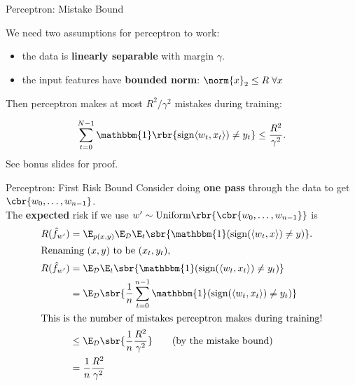 \documentclass[notheorems]{beamer}
\begin{document}
    \begin{frame}{Perceptron: Mistake Bound}
        \begin{theorem}
            We need two assumptions for perceptron to work:
            \begin{itemize}
                \item the data is \textbf{linearly separable} with margin $\gamma$.
                \item the input features have \textbf{bounded norm}: $\norm{x}_2 \leq R \; \forall x$
            \end{itemize}
            Then perceptron makes at most $R^2 / \gamma^2$ mistakes during training:
            \begin{minipage}[t]{0.6\textwidth}
                \[ \sum_{t=0}^{N-1} \mathbbm{1}\rbr{\text{sign}\langle w_t, x_t \rangle) \neq y_t} \leq \frac{R^2}{\gamma^2}. \]
                See bonus slides for proof.
            \end{minipage}
            \begin{minipage}[t]{0.35\textwidth}
                \vspace{0.2cm}
                \begin{figure}
                    \raggedleft
                    
                    \vspace{-0.1cm}
                \end{figure}
            \end{minipage}

            \end{theorem}

    \end{frame}

    \begin{frame}{Perceptron: First Risk Bound}
        Consider doing \textbf{one pass} through the data to get $\cbr{w_0, \dots, w_{n-1}}$.\vspace{0.25cm}\\
        The \textbf{expected} risk if we use $w' \sim  \text{Uniform}\rbr{\cbr{w_0, \dots, w_{n-1}}}$ is
        \begin{align*}
        R(\hat f_{w'}) &= \E_{p(x,y)} \E_\mathcal{D} \E_t \sbr{ \mathbbm{1}(\text{sign}(\langle w_t, x\rangle) \neq y)}.\\
        \intertext{Renaming $(x,y)$ to be $(x_t,y_t)$,}
        R(\hat f_{w'}) &= \E_\mathcal{D} \E_t \sbr{ \mathbbm{1}(\text{sign}(\langle w_t, x_t\rangle) \neq y_t)}\\
        &= \E_\mathcal{D} \sbr{ \frac{1}{n}\sum_{t=0}^{n-1} \mathbbm{1}(\text{sign}(\langle w_t, x_t\rangle) \neq y_t)}\\
        \intertext{This is the number of mistakes perceptron makes during training!}
        &\leq \E_\mathcal{D} \sbr{ \frac{1}{n} \frac{R^2}{\gamma^2} } \tag{by the mistake bound} \\
        &= \frac{1}{n} \frac{R^2}{\gamma^2} \\
        \end{align*}
    \end{frame}
\end{document}
